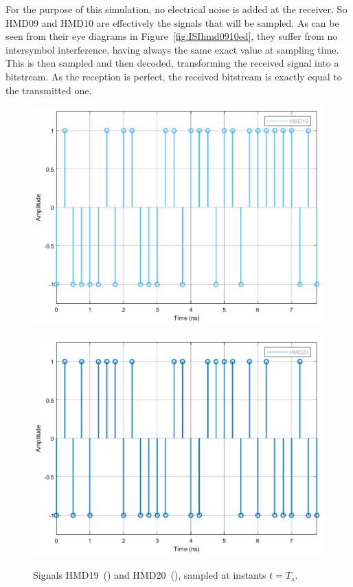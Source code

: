 For the purpose of this simulation, no electrical noise is added at the 
receiver. So HMD09 and HMD10 are effectively the signals that will be sampled. 
As can be seen from their 
eye diagrams in Figure~\ref{fig:ISIhmd0910ed}, they suffer from no intersymbol 
interference, having always the same exact value at sampling time. This is then 
sampled and then decoded, transforming the received signal into a bitstream. As 
the reception is perfect, the received bitstream is exactly equal to the 
transmitted one.

	\begin{figure}[H]
	\centering
	\begin{minipage}{0.45\textwidth}
		\centering
		\includegraphics[width=1\textwidth]		
		{./sdf/m_qam_system/figures/simulations/01_noISI/HMD19.pdf}
		\subcaption{}\label{fig:ISIhmd19}
	\end{minipage}
	\begin{minipage}{0.45\textwidth}
		\centering
		\includegraphics[width=1\textwidth]
		{sdf/m_qam_system/figures/simulations/01_noISI/HMD20.pdf}
		\subcaption{}\label{fig:ISIhmd20}
	\end{minipage}
	\caption{Signals HMD19~() and 
		HMD20~(), sampled at instants 
		$t=T_s$.}\label{fig:ISIhmd1920}
\end{figure}

